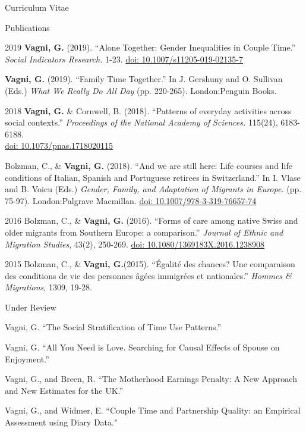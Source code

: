 \documentclass[12pt,a4paper]{article}
\begin{document}
\begin{cv}{Curriculum Vitae}
 
 \newpage
 
   \begin{cvlist}{Publications}
	
	 \item [2019] \textbf{Vagni, G.} (2019). ``Alone Together: Gender Inequalities in Couple Time.'' \emph{Social Indicators Research.} 1-23. \href{https://doi.org/10.1007/s11205-019-02135-7}{doi: 10.1007/s11205-019-02135-7} 
	 
		\item [] \textbf{Vagni, G.}  (2019). ``Family Time Together.'' In J. Gershuny and O. Sullivan (Eds.) \emph{What We Really Do All Day} (pp. 220-265). London:Penguin Books.  
		
		
		 \item [2018] \textbf{Vagni, G.} \& Cornwell, B. (2018). ``Patterns of everyday activities across social contexts.'' \emph{Proceedings of the National Academy of Sciences.} 115(24), 6183-6188. \\ \href{https://doi.org/10.1073/pnas.1718020115}{doi: 10.1073/pnas.1718020115} 
		 		  	
		  		    	 	 
		   \item [] Bolzman, C., \& \textbf{Vagni, G.} (2018). ``And we are still here: Life courses and life conditions of Italian, Spanish and Portuguese retirees in Switzerland.'' In I. Vlase and B. Voicu (Eds.) \emph{Gender, Family, and Adaptation of Migrants in Europe.} (pp. 75-97). London:Palgrave Macmillan. \href{https://doi.org/10.1007/978-3-319-76657-7_4}{doi: 10.1007/978-3-319-76657-74} 
  	 	    	 
   	\item [2016] Bolzman, C., \& \textbf{Vagni, G.}  (2016). ``Forms of care among native Swiss and older migrants from Southern Europe: a comparison.'' \emph{Journal of Ethnic and Migration Studies}, 43(2), 250-269. 
   	\href{https://doi.org/10.1080/1369183X.2016.1238908}{doi: 10.1080/1369183X.2016.1238908} 
   	
   	\item [2015]
   	Bolzman, C., \& \textbf{Vagni, G.}(2015). ``{\'E}galit{\'e} des chances? Une
   	comparaison des conditions de vie des personnes {\^a}g{\'e}es immigr{\'e}es
   	et nationales.'' \emph{Hommes \& Migrations}, 1309, 19-28.
   				  
   \end{cvlist}
 
 \begin{cvlist}{Under Review}
 	\item Vagni, G. ``The Social Stratification of Time Use Patterns.''
   \item Vagni, G. ``All You Need is Love. Searching for Causal Effects of Spouse on Enjoyment.'' 
    \item Vagni, G., and Breen, R. ``The Motherhood Earnings Penalty: A New Approach and New
   Estimates for the UK.''
 	\item Vagni, G., and Widmer, E. ``Couple Time and Partnership Quality: an Empirical Assessment using Diary Data."
 \end{cvlist}
 

\end{cv}
\end{document}
